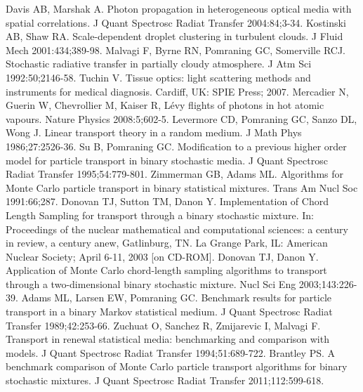 \documentclass[final,authoryear,5p,times,twocolumn]{elsarticle}
\begin{document}
\begin{thebibliography}{10}
 Davis AB, Marshak A. Photon propagation in heterogeneous optical media with spatial correlations. J Quant Spectrosc Radiat Transfer 2004:84;3-34.
 Kostinski AB, Shaw RA. Scale-dependent droplet clustering in turbulent clouds. J Fluid Mech 2001:434;389-98.
 Malvagi F, Byrne RN, Pomraning GC, Somerville RCJ. Stochastic radiative transfer in partially cloudy atmosphere. J Atm Sci 1992:50;2146-58.
 Tuchin V. Tissue optics: light scattering methods and instruments for medical diagnosis. Cardiff, UK: SPIE Press; 2007.
 Mercadier N, Guerin W, Chevrollier M, Kaiser R, L\'evy flights of photons in hot atomic vapours. Nature Physics 2008:5;602-5.
 Levermore CD, Pomraning GC, Sanzo DL, Wong J. Linear transport theory in a random medium. J Math Phys 1986;27:2526-36.
 Su B, Pomraning GC. Modification to a previous higher order model for particle transport in binary stochastic media. J Quant Spectrosc Radiat Transfer 1995;54:779-801.
 Zimmerman GB, Adams ML. Algorithms for Monte Carlo particle transport in binary statistical mixtures. Trans Am Nucl Soc 1991:66;287.
 Donovan TJ, Sutton TM, Danon Y. Implementation of Chord Length Sampling for transport through a binary stochastic mixture. In: Proceedings of the nuclear mathematical and computational sciences: a century in review, a century anew, Gatlinburg, TN. La Grange Park, IL: American Nuclear Society; April 6-11, 2003 [on CD-ROM].
 Donovan TJ, Danon Y. Application of Monte Carlo chord-length sampling algorithms to transport through a two-dimensional binary stochastic mixture. Nucl Sci Eng 2003;143:226-39.
 Adams ML, Larsen EW, Pomraning GC. Benchmark results for particle transport in a binary Markov statistical medium. J Quant Spectrosc Radiat Transfer 1989;42:253-66.
 Zuchuat O, Sanchez R, Zmijarevic I, Malvagi F. Transport in renewal statistical media: benchmarking and comparison with models. J Quant Spectrosc Radiat Transfer 1994;51:689-722.
 Brantley PS. A benchmark comparison of Monte Carlo particle transport algorithms for binary stochastic mixtures. J Quant Spectrosc Radiat Transfer 2011;112:599-618.

\end{thebibliography}
\end{document}
